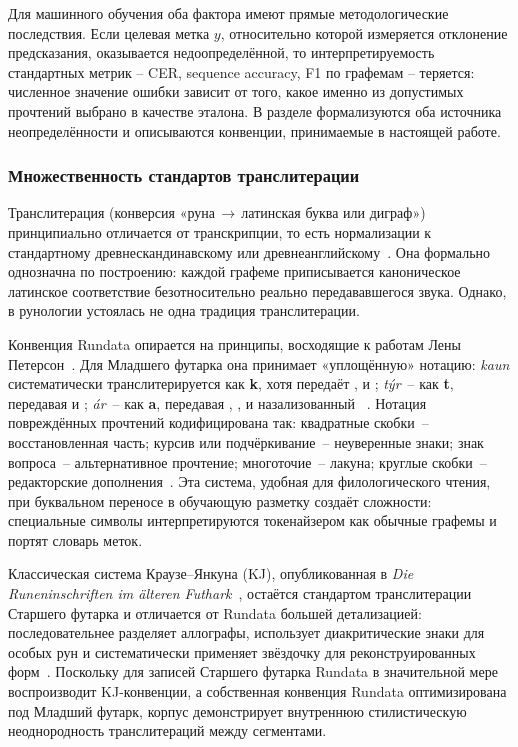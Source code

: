 \documentclass[a4paper,12pt]{extarticle}
\begin{document}
Для машинного обучения оба фактора имеют прямые методологические последствия. 
Если целевая метка $y$, относительно которой измеряется отклонение предсказания, 
оказывается недоопределённой, то интерпретируемость стандартных метрик -- CER, 
sequence accuracy, F1 по графемам -- теряется: численное значение ошибки 
зависит от того, какое именно из допустимых прочтений выбрано в качестве 
эталона. В разделе формализуются оба источника неопределённости и описываются конвенции, принимаемые в настоящей работе.

\subsubsection{Множественность стандартов транслитерации}

Транслитерация (конверсия «руна\,$\to$\,латинская буква или диграф») принципиально отличается от транскрипции, то есть нормализации к стандартному древнескандинавскому или древнеанглийскому~\cite{spurkland2005,barnes2012}. Она формально однозначна по построению: каждой графеме приписывается каноническое латинское соответствие безотносительно реально передававшегося звука. Однако, в рунологии устоялась не одна традиция транслитерации.

Конвенция Rundata опирается на принципы, восходящие к работам Лены Петерсон~\cite{jesch2013}. Для Младшего футарка она принимает «уплощённую» нотацию: \textit{kaun} систематически транслитерируется как \textbf{k}, хотя передаёт ,  и ; \textit{týr}~-- как \textbf{t}, передавая  и ; \textit{ár}~-- как \textbf{a}, передавая , ,  и назализованный ~\cite{spurkland2005,duwel2008}. Нотация повреждённых прочтений кодифицирована так: квадратные скобки~-- восстановленная часть; курсив или подчёркивание~-- неуверенные знаки; знак вопроса~-- альтернативное прочтение; многоточие~-- лакуна; круглые скобки~-- редакторские дополнения~\cite{jesch2013}. Эта система, удобная для филологического чтения, при буквальном переносе в обучающую разметку создаёт сложности: специальные символы интерпретируются токенайзером как обычные графемы и портят словарь меток.

Классическая система Краузе--Янкуна (KJ), опубликованная в \textit{Die Runeninschriften im älteren Futhark}~\cite{krause1966}, остаётся стандартом транслитерации Старшего футарка и отличается от Rundata большей детализацией: последовательнее разделяет аллографы, использует диакритические знаки для особых рун и систематически применяет звёздочку для реконструированных форм~\cite{krause1966,antonsen1975}. Поскольку для записей Старшего футарка Rundata в значительной мере воспроизводит KJ-конвенции, а собственная конвенция Rundata оптимизирована под Младший футарк, корпус демонстрирует внутреннюю стилистическую неоднородность транслитераций между сегментами.
\end{document}
